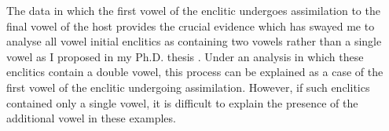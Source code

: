 \begin{exe}
	\label{ex:RoqVowAssGlot}
\end{exe}


The data in which the first vowel of the enclitic
undergoes assimilation to the final vowel of the host
provides the crucial evidence which has swayed me to analyse
all vowel initial enclitics as containing two vowels
rather than a single vowel as I proposed in my Ph.D. thesis \citep{ed16b}.
Under an analysis in which these enclitics contain a double vowel,
this process can be explained as a case of the first
vowel of the enclitic undergoing assimilation.
However, if such enclitics contained only a single vowel,
it is difficult to explain the presence of the additional vowel in these examples.